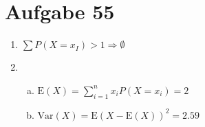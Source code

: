 \section{Aufgabe 55}
\setcounter{section}{55}

\begin{enumerate}
    \item $\sum P(X = x_I) > 1 \Rightarrow \emptyset$

    \item
        \begin{enumerate}[(a)]
            \item $\text{E}(X) = \sum_{i = 1}^n x_iP(X = x_i) = 2$
            \item $\text{Var}(X) = \text{E}(X - \text{E}(X))^2 = 2.59$
        \end{enumerate}
\end{enumerate}
